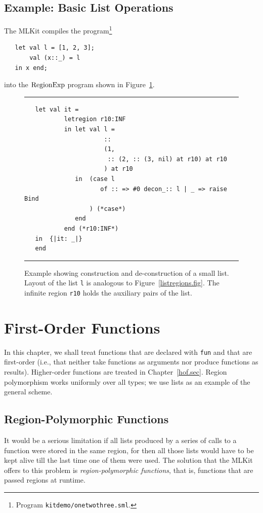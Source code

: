 \documentclass[12pt]{book}
\begin{document}
\section{Example: Basic List Operations}
\label{listexamples.sec}
The MLKit compiles the program\footnote{Program \texttt{kitdemo/onetwothree.sml}.}  
\begin{verbatim}
   let val l = [1, 2, 3];
       val (x::_) = l
   in x end;
\end{verbatim}       
into the $\hbox{\rm RegionExp}$ program shown in Figure~\ref{listprint.fig}.
\begin{figure}
\hrule \medskip
\begin{verbatim}
   let val it = 
           letregion r10:INF 
           in let val l = 
                      :: 
                      (1, 
                       :: (2, :: (3, nil) at r10) at r10
                      ) at r10
              in  (case l 
                     of :: => #0 decon_:: l | _ => raise Bind
                  ) (*case*) 
              end  
           end (*r10:INF*)
   in  {|it: _|}
   end 
\end{verbatim}
\caption{Example showing construction and de-construction of a small list.
Layout of the list {\tt l} is analogous to Figure~\ref{listregions.fig}.
The infinite region {\tt r10} holds the auxiliary pairs of the list.
}
\label{listprint.fig}
\medskip

\hrule
\end{figure}


\chapter{First-Order Functions}
In this chapter, we shall treat
%
%
functions that are declared with 
{\tt fun} and that are first-order (i.e., that neither take functions
as arguments nor produce functions as results). Higher-order functions
are treated in Chapter~\ref{hof.sec}.  Region polymorphism works
uniformly over all types; we use lists as an example of the general
scheme.

\section{Region-Polymorphic Functions}
\label{region-polymorphic-functions.sec}
%
It would be a serious limitation if all lists produced by a series of
calls to a function were stored in the same region, for then all those
lists would have to be kept alive till the last time one of them were
used. The solution that the MLKit offers to this problem is {\em
  region-polymorphic functions}, that is, functions that are passed
regions at runtime.
\end{document}
